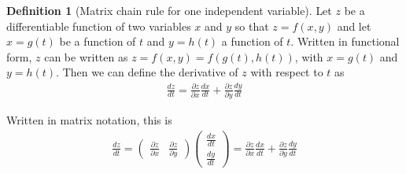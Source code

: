 \documentclass[
]{book}
\theoremstyle{definition}
\newtheorem{definition}{Definition}[chapter]
\theoremstyle{definition}
\theoremstyle{definition}
\theoremstyle{remark}
\begin{document}
\begin{definition}[Matrix chain rule for one independent variable]
\protect\hypertarget{def:unnamed-chunk-284}{}{\label{def:unnamed-chunk-284} {} }Let \(z\) be a differentiable function of two variables \(x\) and \(y\) so that \(z = f(x, y)\) and let \(x=g(t)\) be a function of \(t\) and \(y=h(t)\) a function of \(t\). Written in functional form, \(z\) can be written as \(z = f(x, y) = f(g(t), h(t))\), with \(x=g(t)\) and \(y=h(t)\). Then we can define the derivative of \(z\) with respect to \(t\) as
\[
\begin{aligned}
\frac{dz}{dt} = \frac{\partial z}{ \partial x}\frac{dx}{dt} + \frac{\partial z}{\partial y}\frac{dy}{dt}
\end{aligned}
\]

Written in matrix notation, this is
\[
\begin{aligned}
\frac{dz}{dt} = \begin{pmatrix} \frac{\partial z}{ \partial x} & \frac{\partial z}{\partial y} \end{pmatrix} \begin{pmatrix} \frac{dx}{dt} \\  \frac{dy}{dt} \end{pmatrix} = \frac{\partial z}{ \partial x}\frac{dx}{dt} + \frac{\partial z}{\partial y}\frac{dy}{dt}
\end{aligned}
\]
\end{definition}
\end{document}
